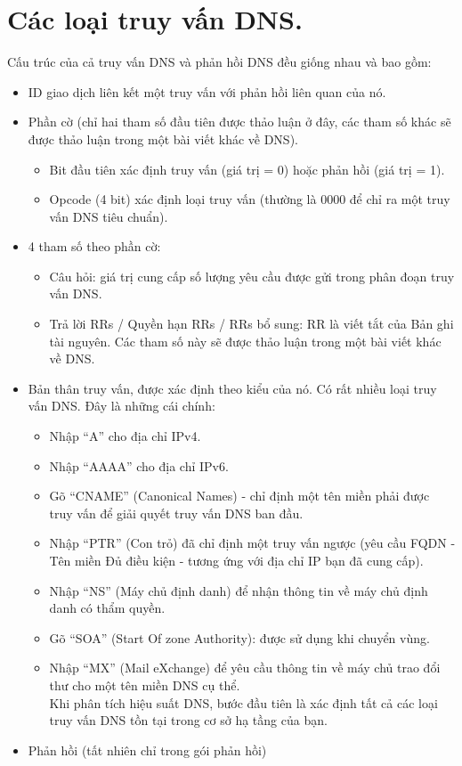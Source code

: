 \documentclass{article}
\begin{document}
\section{Các loại truy vấn DNS.}
    Cấu trúc của cả truy vấn DNS và phản hồi DNS đều giống nhau và bao gồm:
\begin{itemize}
    \item ID giao dịch liên kết một truy vấn với phản hồi liên quan của nó.
    \item Phần cờ (chỉ hai tham số đầu tiên được thảo luận ở đây, các tham số khác sẽ được thảo luận trong một bài viết khác về DNS).
    \begin{itemize}
        \item Bit đầu tiên xác định truy vấn (giá trị = 0) hoặc phản hồi (giá trị = 1).
        \item Opcode (4 bit) xác định loại truy vấn (thường là 0000 để chỉ ra một truy vấn DNS tiêu chuẩn).
    \end{itemize}
    \item 4 tham số theo phần cờ:
    \begin{itemize}
        \item Câu hỏi: giá trị cung cấp số lượng yêu cầu được gửi trong phân đoạn truy vấn DNS.
        \item Trả lời RRs / Quyền hạn RRs / RRs bổ sung: RR là viết tắt của Bản ghi tài nguyên. Các tham số này sẽ được thảo luận trong một bài viết khác về DNS.
    \end{itemize}
    \item Bản thân truy vấn, được xác định theo kiểu của nó. Có rất nhiều loại truy vấn DNS. Đây là những cái chính:
    \begin{itemize}
        \item Nhập “A” cho địa chỉ IPv4.
        \item Nhập “AAAA” cho địa chỉ IPv6.
        \item Gõ “CNAME” (Canonical Names) - chỉ định một tên miền phải được truy vấn để giải quyết truy vấn DNS ban đầu.
        \item Nhập “PTR” (Con trỏ) đã chỉ định một truy vấn ngược (yêu cầu FQDN -  Tên miền Đủ điều kiện  - tương ứng với địa chỉ IP bạn đã cung cấp).
        \item Nhập “NS” (Máy chủ định danh) để nhận thông tin về máy chủ định danh có thẩm quyền.
        \item Gõ “SOA” (Start Of zone Authority): được sử dụng khi chuyển vùng.
        \item Nhập “MX” (Mail eXchange) để yêu cầu thông tin về máy chủ trao đổi thư cho một tên miền DNS cụ thể.\\
        Khi phân tích hiệu suất DNS, bước đầu tiên là xác định tất cả các loại truy vấn DNS tồn tại trong cơ sở hạ tầng của bạn.
        
    \end{itemize}
    \item Phản hồi (tất nhiên chỉ trong gói phản hồi)
\end{itemize}
\end{document}
